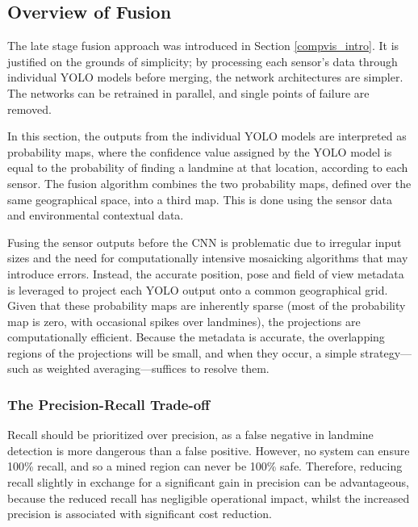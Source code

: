 \subsection{Overview of Fusion} \label{fusion_overview}

    \noindent The late stage fusion approach was introduced in Section \ref{compvis_intro}. It is justified on the grounds of simplicity; by processing each sensor's data through individual YOLO models before merging, the network architectures are simpler. The networks can be retrained in parallel, and single points of failure are removed. 
    


    \noindent In this section, the outputs from the individual YOLO models are interpreted as probability maps, where the confidence value assigned by the YOLO model is equal to the probability of finding a landmine at that location, according to each sensor. The fusion algorithm combines the two probability maps, defined over the same geographical space, into a third map. This is done using the sensor data and environmental contextual data.

    Fusing the sensor outputs before the CNN is problematic due to irregular input sizes and the need for computationally intensive mosaicking algorithms that may introduce errors. Instead, the accurate position, pose and field of view metadata  is leveraged to project each YOLO output onto a common geographical grid. Given that these probability maps are inherently sparse (most of the probability map is zero, with occasional spikes over landmines), the projections are computationally efficient. Because the metadata is accurate, the overlapping regions of the projections will be small, and when they occur, a simple strategy—such as weighted averaging—suffices to resolve them.

    \subsubsection{The Precision-Recall Trade-off } \label{lossmatrix}

        Recall should be prioritized over precision, as a false negative in landmine detection is more dangerous than a false positive. However, no system can ensure 100\% recall, and so a mined region can never be 100\% safe. Therefore, reducing recall slightly in exchange  for a significant gain in precision can be advantageous, because the reduced recall has negligible operational impact, whilst the increased precision is associated with significant cost reduction.